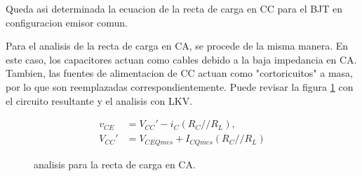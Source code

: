 \documentclass[chaptersright]{informeutn}
\begin{document}
    Queda asi determinada la ecuacion de la recta de carga en CC para el BJT en configuracion emisor comun.

    Para el analisis de la recta de carga en CA, se procede de la misma manera. En este caso, los capacitores actuan
    como cables debido a la baja impedancia en CA. Tambien, las fuentes de alimentacion de CC actuan como
    "cortoricuitos" a masa, por lo que son reemplazadas correspondientemente. Puede revisar la figura \ref{fig:recta_ca}
    con el circuito resultante y el analisis con LKV.
    \begin{figure}[H]
      \centering
      \begin{minipage}{0.49\textwidth}
      \end{minipage}
      \begin{minipage}{0.49\textwidth}
        \begin{align*}
          v_{CE} &= V_{CC}' - i_C (R_C//R_L),\\[6pt]
          V_{CC}' &= V_{CEQ mes} + I_{CQ mes} (R_C//R_L)
        \end{align*}
      \end{minipage}
      \caption{analisis para la recta de carga en CA.}
      \label{fig:recta_ca}
    \end{figure}
\end{document}
